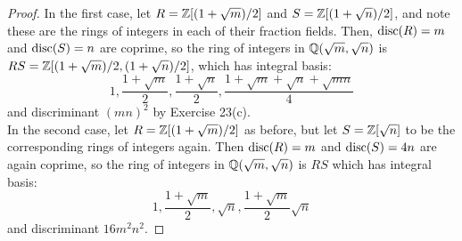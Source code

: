 \begin{proof} 
    In the first case, let $R = \mathbb{Z}[(1+\sqrt{m})/2]$ and $S = \mathbb{Z}[(1+\sqrt{n})/2]$, and note these are the rings of integers in each of their fraction fields. Then, $\operatorname{disc}(R) = m$ and $\operatorname{disc}(S) = n$ are coprime, so the ring of integers in $\mathbb{Q}(\sqrt{m},\sqrt{n})$ is $RS = \mathbb{Z}[(1+\sqrt{m})/2, (1+\sqrt{n})/2]$, which has integral basis:
    \[ 1, \frac{1+\sqrt{m}}{2}, \frac{1+\sqrt{n}}{2}, \frac{1+\sqrt{m}+\sqrt{n}+\sqrt{mn}}{4} \]
    and discriminant $(mn)^2$ by Exercise 23(c). \\

    In the second case, let $R = \mathbb{Z}[(1+\sqrt{m})/2]$ as before, but let $S = \mathbb{Z}[\sqrt{n}]$ to be the corresponding rings of integers again. Then $\operatorname{disc}(R) = m$ and $\operatorname{disc}(S) = 4n$ are again coprime, so the ring of integers in $\mathbb{Q}(\sqrt{m},\sqrt{n})$ is $RS$ which has integral basis:
    \[ 1, \frac{1+\sqrt{m}}{2}, \sqrt{n}, \frac{1+\sqrt{m}}{2}\sqrt{n} \]
    and discriminant $16m^2n^2$.
\end{proof}
